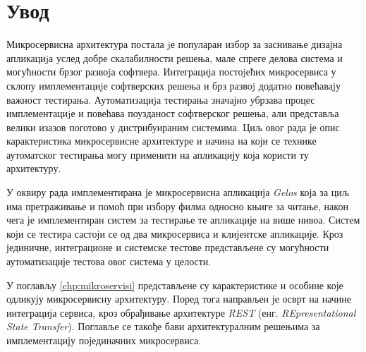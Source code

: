 \documentclass[12pt,oneside]{memoir}
\begin{document}
\frontmatter
\naslovna
\komisija
{}
\apstrakt
\tableofcontents*

\mainmatter

\chapter{Увод}

Микросервисна архитектура постала jе популаран избор за заснивање дизајна апликациjа услед добре скалабилности решења, мале спреге делова система и могућности брзог развоjа софтвера. Интеграциjа постоjећих микросервиса у склопу имплементациjе софтверских решења и брз развоj додатно повећаваjу важност тестирања.
Аутоматизациjа тестирања значајно  убрзава процес имплементациjе и повећава поузданост софтверског решења, али представља велики изазов поготово у дистрибуираним системима. Циљ овог рада је опис карактеристика микросервисне архитектуре и начина на који се технике аутоматског тестирања могу применити на апликацију која користи ту архитектуру.

У оквиру рада имплементирана је микросервисна апликација \textit{Gelos} која за циљ има претраживање и помоћ при избору филма односно књиге за читање, након чега је имплементиран систем за тестирање те апликације на више нивоа. Систем који се тестира састоји се од два микросервиса и клијентске апликације. Кроз јединичне, интеграционе и системске тестове представљене су могућности аутоматизације тестова овог система у целости.

У поглављу \ref{chp:mikroservisi} представљене су карактеристике и особине које одликују микросервисну архитектуру. Поред тога направљен је осврт на начине интеграција сервиса, кроз обрађивање архитектуре \textit{REST} (енг. \textit{REpresentational State Transfer}). Поглавље се такође бави архитектуралним решењима за имплементацију појединачних микросервиса.
\end{document}
